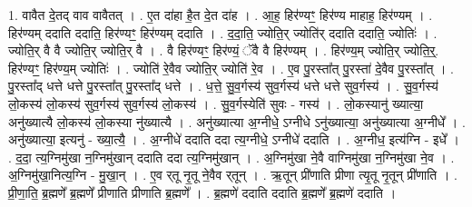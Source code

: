 \documentclass[17pt]{extarticle}
\begin{document}
1. वावैत दे॒तद् वाव वावैतत् । . ए॒त दा॑हा है॒त दे॒त दा॑ह । . आ॒ह॒ हिर॑ण्यꣳ॒॒ हिर॑ण्य माहाह॒ हिर॑ण्यम् । . हिर॑ण्यम् ददाति ददाति॒ हिर॑ण्यꣳ॒॒ हिर॑ण्यम् ददाति । . द॒दा॒ति॒ ज्योति॒र् ज्योति॑र् ददाति ददाति॒ ज्योतिः॑ । . ज्योति॒र् वै वै ज्योति॒र् ज्योति॒र् वै । . वै हिर॑ण्यꣳ॒॒ हिर॑ण्यं॒ ॅवै वै हिर॑ण्यम् । . हिर॑ण्य॒म् ज्योति॒र् ज्योति॒र्॒. हिर॑ण्यꣳ॒॒ हिर॑ण्य॒म् ज्योतिः॑ । . ज्योति॑ रे॒वैव ज्योति॒र् ज्योति॑ रे॒व । . ए॒व पु॒रस्ता᳚त् पु॒रस्ता॑ दे॒वैव पु॒रस्ता᳚त् । . पु॒रस्ता᳚द् धत्ते धत्ते पु॒रस्ता᳚त् पु॒रस्ता᳚द् धत्ते । . ध॒त्ते॒ सु॒व॒र्गस्य॑ सुव॒र्गस्य॑ धत्ते धत्ते सुव॒र्गस्य॑ । . सु॒व॒र्गस्य॑ लो॒कस्य॑ लो॒कस्य॑ सुव॒र्गस्य॑ सुव॒र्गस्य॑ लो॒कस्य॑ । . सु॒व॒र्गस्येति॑ सुवः - गस्य॑ । . लो॒कस्यानु॑ ख्यात्या॒ अनु॑ख्यात्यै लो॒कस्य॑ लो॒कस्या नु॑ख्यात्यै । . अनु॑ख्यात्या अ॒ग्नीधे॒ ऽग्नीधे ऽनु॑ख्यात्या॒ अनु॑ख्यात्या अ॒ग्नीधे᳚ । . अनु॑ख्यात्या॒ इत्यनु॑ - ख्या॒त्यै॒ । . अ॒ग्नीधे॑ ददाति ददा त्य॒ग्नीधे॒ ऽग्नीधे॑ ददाति । . अ॒ग्नीध॒ इत्य॑ग्नि - इधे᳚ । . द॒दा॒ त्य॒ग्निमु॑खा न॒ग्निमु॑खान् ददाति ददा त्य॒ग्निमु॑खान् । . अ॒ग्निमु॑खा ने॒वै वाग्निमु॑खा न॒ग्निमु॑खा ने॒व । . अ॒ग्निमु॑खा॒नित्य॒ग्नि - मु॒खा॒न् । . ए॒व र्‌तू नृ॒तू ने॒वैव र्‌तून् । . ऋ॒तून् प्री॑णाति प्रीणा त्यृ॒तू नृ॒तून् प्री॑णाति । . प्री॒णा॒ति॒ ब्र॒ह्मणे᳚ ब्र॒ह्मणे᳚ प्रीणाति प्रीणाति ब्र॒ह्मणे᳚ । . ब्र॒ह्मणे॑ ददाति ददाति ब्र॒ह्मणे᳚ ब्र॒ह्मणे॑ ददाति । \newline
\end{document}

